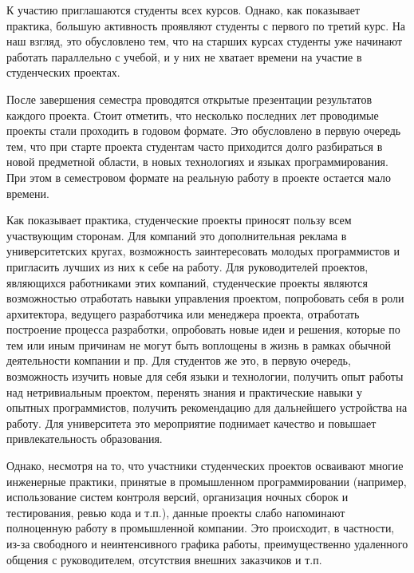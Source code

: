 \documentclass[a4paper]{article}
\begin{document}
К участию приглашаются студенты всех курсов. Однако, как показывает практика, б\textit{о}льшую активность проявляют студенты с первого по третий курс. На наш взгляд, это обусловлено тем, что на старших курсах студенты уже начинают работать параллельно с учебой, и у них не хватает времени на участие в студенческих проектах. 

После завершения семестра проводятся открытые презентации результатов каждого проекта. Стоит отметить, что несколько последних лет проводимые проекты стали проходить в годовом формате. Это обусловлено в первую очередь тем, что при старте проекта студентам часто приходится долго разбираться в новой предметной области, в новых технологиях и языках программирования. При этом в семестровом формате на реальную работу в проекте остается мало времени. 

Как показывает практика, студенческие проекты приносят пользу всем участвующим сторонам. Для компаний это дополнительная реклама в университетских кругах, возможность заинтересовать молодых программистов и пригласить лучших из них к себе на работу. Для руководителей проектов, являющихся работниками этих компаний, студенческие проекты являются возможностью отработать навыки управления проектом, попробовать себя в роли архитектора, ведущего разработчика или менеджера проекта, отработать построение процесса разработки, опробовать новые идеи и решения, которые по тем или иным причинам не могут быть воплощены в жизнь в рамках обычной деятельности компании и пр. Для студентов же это, в первую очередь, возможность изучить новые для себя языки и технологии, получить опыт работы над нетривиальным проектом, перенять знания и практические навыки у опытных программистов, получить рекомендацию для дальнейшего устройства на работу. Для университета это мероприятие поднимает качество и повышает привлекательность образования.   

Однако, несмотря на то, что участники студенческих проектов осваивают многие инженерные практики, принятые в промышленном программировании (например, использование систем контроля версий, организация ночных сборок и тестирования, ревью кода и т.п.), данные проекты слабо напоминают полноценную работу в промышленной компании. Это происходит, в частности, из-за свободного и неинтенсивного графика работы, преимущественно удаленного общения с руководителем, отсутствия внешних заказчиков и т.п.
\end{document}

